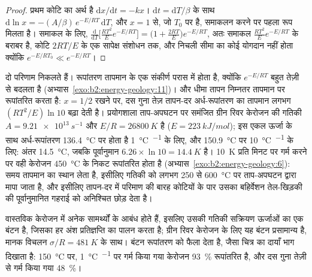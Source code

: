 \begin{proof}
प्रथम कोटि का अर्थ है $\mathrm{d}x/\mathrm{d}t = -k x$। $\mathrm{d}t = \mathrm{d}T/\beta$ के साथ
$\mathrm{d}\ln x = -(A/\beta)\,e^{-E/RT}\,\mathrm{d}T$, और $x = 1$ से, जो $T_0$ पर है, समाकलन करने पर
पहला रूप मिलता है। समाकल के लिए, $\frac{\mathrm{d}}{\mathrm{d}T}\bigl[\frac{RT^2}{E}e^{-E/RT}\bigr]
= \bigl(1 + \frac{2RT}{E}\bigr)e^{-E/RT}$, अतः समाकल $\frac{RT^2}{E}e^{-E/RT}$ के बराबर है, कोटि
$2RT/E$ के एक सापेक्ष संशोधन तक, और निचली सीमा का कोई योगदान नहीं होता क्योंकि $e^{-E/RT_0} \ll
e^{-E/RT}$।
\end{proof}

दो परिणाम निकलते हैं। रूपांतरण तापमान के एक संकीर्ण परास में होता है, क्योंकि
$e^{-E/RT}$ बहुत तेज़ी से बदलता है (अभ्यास~\ref{exo:b2:energy-geology:11})। और धीमा तापन निम्नतर
तापमान पर रूपांतरित करता है: $x = 1/2$ रखने पर, दस गुना तेज़ तापन-दर अर्ध-रूपांतरण का तापमान
लगभग $(RT^2/E)\ln 10$ बढ़ा देती है। प्रयोगशाला ताप-अपघटन पर समंजित ग्रीन रिवर केरोजन की गतिकी
$A = \qty{9.21e13}{s^{-1}}$ और $E/R = \qty{26800}{K}$ है ($E =
\qty{223}{kJ/mol}$); इस एकल ऊर्जा के साथ अर्ध-रूपांतरण \qty{136.4}{\celsius} पर होता है
\qty{1}{\celsius\per\Myr} के लिए, और \qty{150.9}{\celsius} पर \qty{10}{\celsius\per\Myr} के लिए: अंतर
\qty{14.5}{\celsius}, जबकि पूर्वानुमान $6.26 \times \ln 10 = \qty{14.4}{K}$ है।
\qty{10}{K} प्रति मिनट पर गर्म करने पर वही केरोजन \qty{450}{\celsius} के निकट रूपांतरित होता है
(अभ्यास~\ref{exo:b2:energy-geology:6}): समय तापमान का स्थान लेता है, इसीलिए गतिकी को लगभग 250 से
\qty{600}{\celsius} पर ताप-अपघटन द्वारा मापा जाता है, और इसीलिए तापन-दर में परिमाण की बारह कोटियों के पार
उसका बहिर्वेशन तेल-खिड़की की पूर्वानुमानित गहराई को अनिश्चित छोड़ देता है।

वास्तविक केरोजन में अनेक सामर्थ्यों के आबंध होते हैं, इसलिए उसकी गतिकी सक्रियण ऊर्जाओं का एक बंटन है, जिसका
हर अंश प्रतिज्ञप्ति का पालन करता है; ग्रीन रिवर केरोजन के लिए यह बंटन प्रसामान्य है, मानक विचलन
$\sigma/R = \qty{481}{K}$ के साथ। बंटन रूपांतरण को फैला देता है, जैसा चित्र का दायाँ भाग दिखाता है:
\qty{150}{\celsius} पर, \qty{1}{\celsius\per\Myr} पर गर्म किया गया केरोजन \qty{93}{\percent} रूपांतरित है,
और दस गुना तेज़ी से गर्म किया गया
\qty{48}{\percent}।

